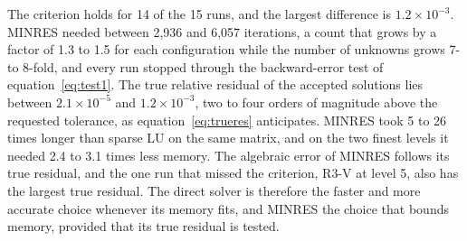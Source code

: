 The criterion holds for 14 of the 15 runs, and the largest difference is $1.2\times10^{-3}$. MINRES needed between 2,936 and 6,057 iterations, a count that grows by a factor of 1.3 to 1.5 for each configuration while the number of unknowns grows 7- to 8-fold, and every run stopped through the backward-error test of equation~\eqref{eq:test1}. The true relative residual of the accepted solutions lies between $2.1\times10^{-5}$ and $1.2\times10^{-3}$, two to four orders of magnitude above the requested tolerance, as equation~\eqref{eq:trueres} anticipates. MINRES took 5 to 26 times longer than sparse LU on the same matrix, and on the two finest levels it needed 2.4 to 3.1 times less memory. The algebraic error of MINRES follows its true residual, and the one run that missed the criterion, R3-V at level 5, also has the largest true residual. The direct solver is therefore the faster and more accurate choice whenever its memory fits, and MINRES the choice that bounds memory, provided that its true residual is tested.
